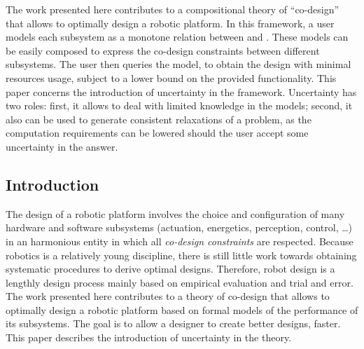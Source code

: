 The work presented here contributes to a compositional theory of
``co-design'' that allows to optimally design a robotic platform.
In this framework, a user models each subsystem as a monotone relation
between  and .
These models can be easily composed to express the co-design constraints
between different subsystems. The user then queries the model, to
obtain the design with minimal resources usage, subject to a lower
bound on the provided functionality. This paper concerns the introduction
of uncertainty in the framework. Uncertainty has two roles: first,
it allows to deal with limited knowledge in the models; second, it
also can be used to generate consistent relaxations of a problem,
as the computation requirements can be lowered should the user accept
some uncertainty in the answer.


\subsection{Introduction}

The design of a robotic platform involves the choice and configuration
of many hardware and software subsystems (actuation, energetics, perception,
control, \ldots{}) in an harmonious entity in which all \emph{co-design
constraints} are respected. Because robotics is a relatively young
discipline, there is still little work towards obtaining systematic
procedures to derive optimal designs. Therefore, robot design is a
lengthly design process mainly based on empirical evaluation and trial
and error. The work presented here contributes to a theory of co-design
that allows to optimally design a robotic platform based on formal
models of the performance of its subsystems. The goal is to allow
a designer to create better designs, faster. This paper describes
the introduction of uncertainty in the theory.


